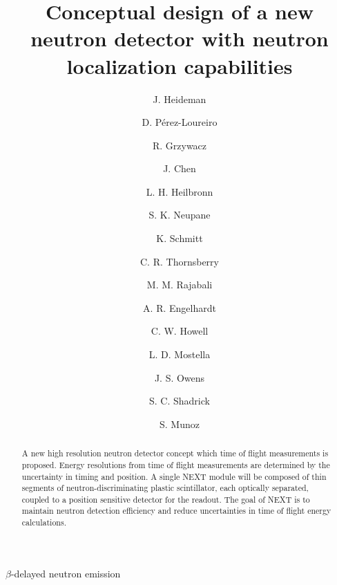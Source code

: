 \documentclass[preprint,3p,twocolumn]{elsarticle}
\begin{document}
\begin{frontmatter}

\title{Conceptual design of a new neutron detector with neutron localization capabilities}


\author[mymainaddress]{J. Heideman}
\author[mymainaddress]{D. P\'erez-Loureiro}

\author[mymainaddress,ORNLaddress]{R. Grzywacz}
\author[mymainaddress]{J. Chen}
\author[UTKNEaddress]{L. H. Heilbronn}
\author[mymainaddress]{S. K. Neupane}
\author[mymainaddress]{K. Schmitt}
\author[mymainaddress]{C. R. Thornsberry}

\author[TTUaddress]{M. M. Rajabali}
\author[TTUaddress]{A. R. Engelhardt}
\author[TTUaddress]{C. W. Howell}
\author[TTUaddress]{L. D. Mostella}
\author[TTUaddress]{J. S. Owens}
\author[TTUaddress]{S. C. Shadrick}

\author[JINPAaddress]{S. Munoz}






\address[mymainaddress]{Department of Physics and Astronomy,  University of Tennessee, Knoxville, Tennessee , 37996 USA}
\address[UTKNEaddress]{Department of Nuclear Engineering,  University of Tennessee, Knoxville, Tennessee , 37996 USA}
\address[ORNLaddress]{Physics Division, Oak Ridge National Laboratory, Oak Ridge TN 37831 USA}
\address[TTUaddress]{Department of Physics Tennessee Technological University, Cookeville, Tennessee, 38505, USA}
\address[JINPAaddress]{Joint Institute for Nuclear Physics and Applications, Oak Ridge TN 37831 USA}


\begin{abstract}
A new high resolution neutron detector concept which time of flight measurements is proposed. Energy resolutions from time of flight measurements are determined by the uncertainty in timing and position. A single NEXT module will be composed of thin segments of neutron-discriminating plastic scintillator, each optically separated, coupled to a position sensitive detector for the readout. The goal of NEXT is to maintain neutron detection efficiency and reduce uncertainties in time of flight energy calculations.
\end{abstract}

\begin{keyword}
$\beta$-delayed neutron emission
\end{keyword}

\end{frontmatter}
\end{document}
